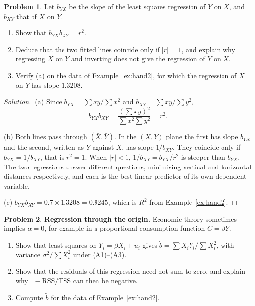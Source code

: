 \documentclass[11pt,a4paper]{article}
\numberwithin{equation}{section}
\theoremstyle{definition}
\newtheorem{problemx}{Problem}[subsection]
\newenvironment{problem}{\begin{problemx}}{\end{problemx}}
\newenvironment{solution}
  {\renewcommand{\qedsymbol}{}\begin{proof}[\textit{Solution}.]}
  {\end{proof}}
\begin{document}
\begin{problem}
Let $b_{YX}$ be the slope of the least squares regression of $Y$ on $X$, and $b_{XY}$ that of $X$ on $Y$.
\begin{enumerate}[label=(\alph*)]
\item Show that $b_{YX}b_{XY} = r^2$.
\item Deduce that the two fitted lines coincide only if $|r| = 1$, and explain why regressing $X$ on $Y$ and inverting does not give the
regression of $Y$ on $X$.
\item Verify (a) on the data of Example~\ref{ex:hand2}, for which the regression of $X$ on $Y$ has slope $1.3208$.
\end{enumerate}
\end{problem}

\begin{solution}
(a) Since $b_{YX} = \sum xy/\sum x^2$ and $b_{XY} = \sum xy/\sum y^2$,
\[
b_{YX}b_{XY} = \frac{(\sum xy)^2}{\sum x^2\sum y^2} = r^2 .
\]

(b) Both lines pass through $(\bar X, \bar Y)$. In the $(X, Y)$ plane the first has slope $b_{YX}$ and the second, written as $Y$ against $X$,
has slope $1/b_{XY}$. They coincide only if $b_{YX} = 1/b_{XY}$, that is $r^2 = 1$. When $|r| < 1$, $1/b_{XY} = b_{YX}/r^2$ is steeper than
$b_{YX}$. The two regressions answer different questions, minimising vertical and horizontal distances respectively, and each is the best linear
predictor of its own dependent variable.

(c) $b_{YX}b_{XY} = 0.7 \times 1.3208 = 0.9245$, which is $R^2$ from Example~\ref{ex:hand2}.
\end{solution}

\begin{problem}
\label{prob:origin}
\textbf{Regression through the origin.} Economic theory sometimes implies $\alpha = 0$, for example in a proportional consumption function
$C = \beta Y$.
\begin{enumerate}[label=(\alph*)]
\item Show that least squares on $Y_i = \beta X_i + u_i$ gives $\tilde b = \sum X_iY_i/\sum X_i^2$, with variance $\sigma^2/\sum X_i^2$ under (A1)--(A3).
\item Show that the residuals of this regression need not sum to zero, and explain why $1 - \text{RSS}/\text{TSS}$ can then be negative.
\item Compute $\tilde b$ for the data of Example~\ref{ex:hand2}.
\end{enumerate}
\end{problem}
\end{document}
